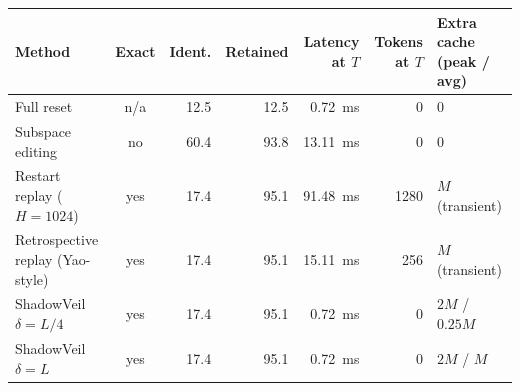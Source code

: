 \begin{tabular}{lcrrrrl}
\toprule
Method & Exact & Ident. & Retained & Latency at $T$ & Tokens at $T$ & Extra cache (peak / avg) \\
\midrule
Full reset & n/a & 12.5 & 12.5 & 0.72~ms & 0 & 0 \\
Subspace editing & no & 60.4 & 93.8 & 13.11~ms & 0 & 0 \\
Restart replay ($H{=}1024$) & yes & 17.4 & 95.1 & 91.48~ms & 1280 & $M$ (transient) \\
Retrospective replay (Yao-style) & yes & 17.4 & 95.1 & 15.11~ms & 256 & $M$ (transient) \\
ShadowVeil $\delta{=}L/4$ & yes & 17.4 & 95.1 & 0.72~ms & 0 & $2M$ / $0.25M$ \\
ShadowVeil $\delta{=}L$ & yes & 17.4 & 95.1 & 0.72~ms & 0 & $2M$ / $M$ \\
\bottomrule
\end{tabular}
